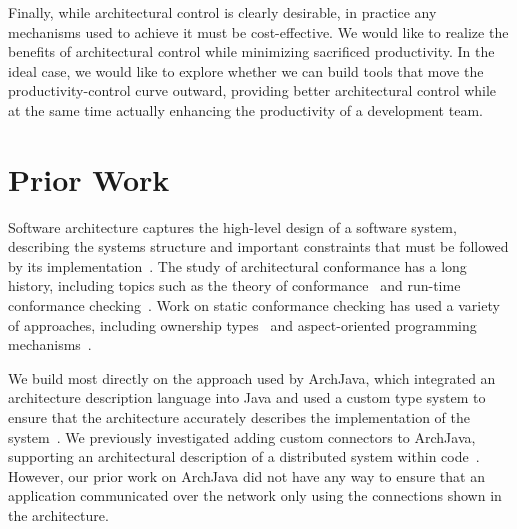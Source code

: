 \documentclass[runningheads]{llncs}
\begin{document}
\begin{sloppypar}
\begin{itemize}

\end{itemize}

Finally, while architectural control is clearly desirable, in practice any mechanisms used to achieve it must be cost-effective.  We would like to realize the benefits of architectural control while minimizing sacrificed productivity.  In the ideal case, we would like to explore whether we can build tools that move the productivity-control curve outward, providing better architectural control while at the same time actually enhancing the productivity of a development team.


\section{Prior Work}

Software architecture captures the high-level design of a software system, describing the systems structure and important constraints that must be followed by its implementation~\cite{SG96,PW92}.  The study of architectural conformance has a long history, including topics such as the theory of conformance~\cite{MQR95} and run-time conformance checking~\cite{LV95}.  Work on static conformance checking has used a variety of approaches, including ownership types~\cite{AA09b} and aspect-oriented programming mechanisms~\cite{Merson-AOP-arch}.

We build most directly on the approach used by ArchJava, which integrated an architecture description language into Java and used a custom type system to ensure that the architecture accurately describes the implementation of the system~\cite{ACN02}.  We previously investigated adding custom connectors to ArchJava, supporting an architectural description of a distributed system within code~\cite{ASCN03}.  However, our prior work on ArchJava did not have any way to ensure that an application communicated over the network only using the connections shown in the architecture.


\end{sloppypar}
\end{document}
